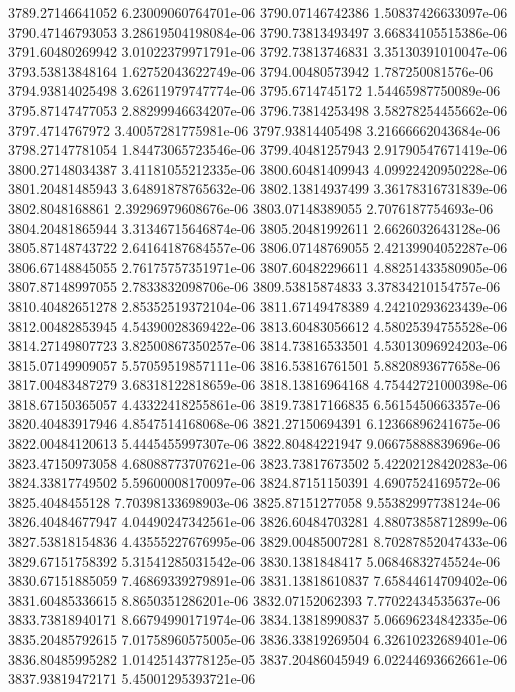 {3789.27146641052 6.23009060764701e-06
3790.07146742386 1.50837426633097e-06
3790.47146793053 3.28619504198084e-06
3790.73813493497 3.66834105515386e-06
3791.60480269942 3.01022379971791e-06
3792.73813746831 3.35130391010047e-06
3793.53813848164 1.62752043622749e-06
3794.00480573942 1.787250081576e-06
3794.93814025498 3.62611979747774e-06
3795.6714745172 1.54465987750089e-06
3795.87147477053 2.88299946634207e-06
3796.73814253498 3.58278254455662e-06
3797.4714767972 3.40057281775981e-06
3797.93814405498 3.21666662043684e-06
3798.27147781054 1.84473065723546e-06
3799.40481257943 2.91790547671419e-06
3800.27148034387 3.41181055212335e-06
3800.60481409943 4.09922420950228e-06
3801.20481485943 3.64891878765632e-06
3802.13814937499 3.36178316731839e-06
3802.8048168861 2.39296979608676e-06
3803.07148389055 2.7076187754693e-06
3804.20481865944 3.31346715646874e-06
3805.20481992611 2.6626032643128e-06
3805.87148743722 2.64164187684557e-06
3806.07148769055 2.42139904052287e-06
3806.67148845055 2.76175757351971e-06
3807.60482296611 4.88251433580905e-06
3807.87148997055 2.7833832098706e-06
3809.53815874833 3.37834210154757e-06
3810.40482651278 2.85352519372104e-06
3811.67149478389 4.24210293623439e-06
3812.00482853945 4.54390028369422e-06
3813.60483056612 4.58025394755528e-06
3814.27149807723 3.82500867350257e-06
3814.73816533501 4.53013096924203e-06
3815.07149909057 5.57059519857111e-06
3816.53816761501 5.8820893677658e-06
3817.00483487279 3.68318122818659e-06
3818.13816964168 4.75442721000398e-06
3818.67150365057 4.43322418255861e-06
3819.73817166835 6.5615450663357e-06
3820.40483917946 4.8547514168068e-06
3821.27150694391 6.12366896241675e-06
3822.00484120613 5.4445455997307e-06
3822.80484221947 9.06675888839696e-06
3823.47150973058 4.68088773707621e-06
3823.73817673502 5.42202128420283e-06
3824.33817749502 5.59600008170097e-06
3824.87151150391 4.6907524169572e-06
3825.4048455128 7.70398133698903e-06
3825.87151277058 9.55382997738124e-06
3826.40484677947 4.04490247342561e-06
3826.60484703281 4.88073858712899e-06
3827.53818154836 4.43555227676995e-06
3829.00485007281 8.70287852047433e-06
3829.67151758392 5.31541285031542e-06
3830.1381848417 5.06846832745524e-06
3830.67151885059 7.46869339279891e-06
3831.13818610837 7.65844614709402e-06
3831.60485336615 8.8650351286201e-06
3832.07152062393 7.77022434535637e-06
3833.73818940171 8.66794990171974e-06
3834.13818990837 5.06696234842335e-06
3835.20485792615 7.01758960575005e-06
3836.33819269504 6.32610232689401e-06
3836.80485995282 1.01425143778125e-05
3837.20486045949 6.02244693662661e-06
3837.93819472171 5.45001295393721e-06
}
